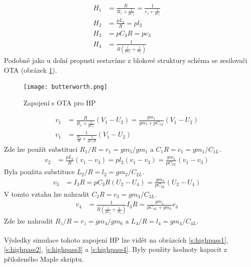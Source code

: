 \begin{align}
H_1 & = \frac{R}{R_z + \frac{1}{pC_1}} = \frac{1}{r_z + \frac{1}{pc_1}}\\
H_2 &= \frac{pL_2}{R} = pl_2\\
H_3 &= pC_3R = pc_3\\
H_4 &= \frac{1}{R(\frac{1}{pL_4} + \frac{1}{R_z})}
\end{align}
Podobně jako u dolní propusti sestavíme z blokové struktury schéma se zesilovači OTA (obrázek \ref{s:OTAHP}).
\begin{figure}[h]
\centering
\texttt{[image: butterworth.png]}
\caption{Zapojení s OTA pro HP \label{s:OTAHP}}
\end{figure}
\begin{align}
v_1 &= \frac{R}{R_1 + \frac{1}{pC_1}}(V_1 - U_2) = \frac{gm_1}{gm_5 + pC_{1L}}(V_1 - U_2)\\
v_1 &= \frac{1}{\frac{R_1}{R} + \frac{1}{pC_1R}}(V_1 - U_2)
\end{align}
Zde lze použít substituci $R_1/R = r_1 = gm_5/gm_1$ a $C_1R = c_1 = gm_1/C_{1L}$.
\begin{align}
v_2 &= \frac{pL_2}{R}(v_1 - v_3) = pl_2(v_1 - v_3) = \frac{gm_2}{pC_{2L}}(v_1 - v_3)
\end{align}
Byla použita substituce $L_2/R = l_2 = gm_2/C_{2L}$.
\begin{align}
v_3 &= I_3R = pC_3R(U_2 - U_4) = \frac{gm_3}{pC_{3L}}(U_2 - U_4)
\end{align}
V tomto vztahu lze nahradit $C_3R = c_3 = gm_3/C_{3L}$.
\begin{align}
v_4 &= \frac{1}{R(\frac{1}{pL_4} + \frac{1}{R_z})}I_3R = \frac{gm_4}{pC_{4L} + gm_6}v_3
\end{align}
Zde lze nahradit $R_z/R = r_z = gm_4/gm_6$ a $L_4/R = l_4 = gm_4/C_{4L}$.\\
\\
Výsledky simulace tohoto zapojení HP lze vidět na obrázcích \ref{s:highpass1}, \ref{s:highpass2}, \ref{s:highpass3} a \ref{s:highpass4}. Byly použity hodnoty kapacit z přiloženého Maple skriptu.\\
